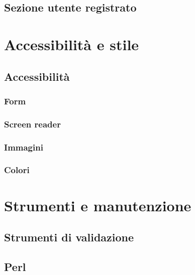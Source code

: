 	\subsection{Sezione utente registrato}
	

\section{Accessibilità e stile} %
	\subsection{Accessibilità}
	
		\subsubsection{Form}
	
		\subsubsection{Screen reader}
		
		\subsubsection{Immagini}
		
		\subsubsection{Colori}
\section{Strumenti e manutenzione} %
	\subsection{Strumenti di validazione}
	
	\subsection{Perl}
